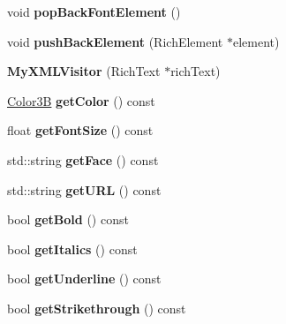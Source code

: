 \begin{DoxyCompactItemize}
\mbox{\label{classMyXMLVisitor_a4c46162b27702c4e45af8fc959c34c79}} 
void {\bfseries pop\+Back\+Font\+Element} ()
\item 
\mbox{\label{classMyXMLVisitor_aa87da874608c0b2ebff352521e7f5d91}} 
void {\bfseries push\+Back\+Element} (Rich\+Element $\ast$element)
\item 
\mbox{\label{classMyXMLVisitor_a56b8607b7e816dfcf5a2eaeb56e664df}} 
{\bfseries My\+X\+M\+L\+Visitor} (Rich\+Text $\ast$rich\+Text)
\item 
\mbox{\label{classMyXMLVisitor_a6861b2431540f01a29d3e4b4902127ca}} 
\hyperlink{structColor3B}{Color3B} {\bfseries get\+Color} () const
\item 
\mbox{\label{classMyXMLVisitor_a1402af12b242f2bb0fe1a3f32df3421f}} 
float {\bfseries get\+Font\+Size} () const
\item 
\mbox{\label{classMyXMLVisitor_a77d4316337823fec2e63774aeef40150}} 
std\+::string {\bfseries get\+Face} () const
\item 
\mbox{\label{classMyXMLVisitor_a29f0af6573fa9b974c2232ea6bdc83d1}} 
std\+::string {\bfseries get\+U\+RL} () const
\item 
\mbox{\label{classMyXMLVisitor_acd0f683d0915d2d2329caeb15547c8fc}} 
bool {\bfseries get\+Bold} () const
\item 
\mbox{\label{classMyXMLVisitor_a4c0a19b1cb58c2c97d86439dd22722a5}} 
bool {\bfseries get\+Italics} () const
\item 
\mbox{\label{classMyXMLVisitor_aaf8db99a90b26f2f0860bb7b70f178c9}} 
bool {\bfseries get\+Underline} () const
\item 
\mbox{\label{classMyXMLVisitor_af5f729532b53b9c5ee03e544da2897a4}} 
bool {\bfseries get\+Strikethrough} () const
\item 
\mbox{\label{classMyXMLVisitor_ada96771dc96f182370b43c2f14277ac6}} 

\end{DoxyCompactItemize}
